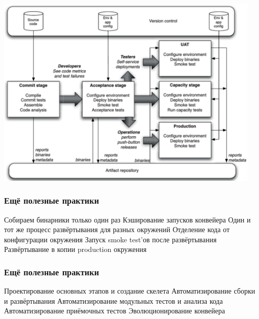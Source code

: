\documentclass{../../slides-style}
\begin{document}
    \begin{frame}
        \begin{center}
            \includegraphics[width=0.95\textwidth]{cdStages.png}
        \end{center}
    \end{frame}

    \begin{frame}
        \frametitle{Ещё полезные практики}
        \begin{outline}
            \1 Собираем бинарники только один раз
                \2 Кэширование запусков конвейера
            \1 Один и тот же процесс развёртывания для разных окружений
                \2 Отделение кода от конфигурации окружения
            \1 Запуск smoke test’ов после развёртывания
            \1 Развёртывание в копии production окружения
        \end{outline}
    \end{frame}

    \begin{frame}
        \frametitle{Ещё полезные практики}
        \begin{outline}[enumerate]
            \1 Проектирование основных этапов и создание скелета
            \1 Автоматизирование сборки и развёртывания
            \1 Автоматизирование модульных тестов и анализа кода
            \1 Автоматизирование приёмочных тестов
            \1 Эволюционирование конвейера
        \end{outline}
    \end{frame}
\end{document}
